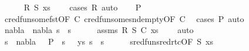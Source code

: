 \begin{isabellebody}
\ \ \ \ \isamarkupfalse%
\ R\ S\ {\isacartoucheopen}xs\ {\isacharequal}{\kern0pt}\ {\isacharbrackleft}{\kern0pt}{\isacharbrackright}{\kern0pt}{\isacartoucheclose}\ \isamarkupfalse%
\ {\isacharparenleft}{\kern0pt}cases\ R{\isacharparenright}{\kern0pt}\ auto\isanewline
\ \ \isamarkupfalse%
\ {\isachardoublequoteopen}P{}\ {\isacharequal}{\kern0pt}\ {\isacharparenleft}{\kern0pt}{\isacharbrackleft}{\kern0pt}{\isacharbrackright}{\kern0pt}{\isacharcomma}{\kern0pt}{\isacharbrackleft}{\kern0pt}{\isacharbrackright}{\kern0pt}{\isacharparenright}{\kern0pt}{\isachardoublequoteclose}\isanewline
\ \ \ \ \isamarkupfalse%
\ cred{\isacharunderscore}{\kern0pt}fun{\isacharunderscore}{\kern0pt}some{\isacharunderscore}{\kern0pt}fst{\isacharbrackleft}{\kern0pt}OF\ C{\isacharbrackright}{\kern0pt}\ cred{\isacharunderscore}{\kern0pt}fun{\isacharunderscore}{\kern0pt}some{\isacharunderscore}{\kern0pt}snd{\isacharunderscore}{\kern0pt}empty{\isacharbrackleft}{\kern0pt}OF\ C{\isacharbrackright}{\kern0pt}\ \isamarkupfalse%
\ {\isacharparenleft}{\kern0pt}cases\ P{}{\isacharparenright}{\kern0pt}\ auto\isanewline
\ \ \isamarkupfalse%
\ {\isachardoublequoteopen}nabla{}\ {\isacharequal}{\kern0pt}\ nabla{\isachardoublequoteclose}\ {\isachardoublequoteopen}s{}\ {\isacharequal}{\kern0pt}\ s{\isachardoublequoteclose}\isanewline
\ \ \ \ \isamarkupfalse%
\ assms\ R\ S\ C\ {\isacartoucheopen}xs\ {\isacharequal}{\kern0pt}\ {\isacharbrackleft}{\kern0pt}{\isacharbrackright}{\kern0pt}{\isacartoucheclose}\ \isamarkupfalse%
\ auto\isanewline
\ \ \isamarkupfalse%
\ s{}\ \ {\isachardoublequoteopen}nabla{}\ {\isacharequal}{\kern0pt}\ {\isacharbraceleft}{\kern0pt}{\isacharbraceright}{\kern0pt}{\isachardoublequoteclose}\ {\isachardoublequoteopen}P\ {\isasymturnstile}\ s{}\ {\isasymleadsto}\isactrlsup {\isacharasterisk}{\kern0pt}\ {\isacharparenleft}{\kern0pt}{\isacharbrackleft}{\kern0pt}{\isacharbrackright}{\kern0pt}{\isacharcomma}{\kern0pt}\ ys{\isacharparenright}{\kern0pt}{\isachardoublequoteclose}\ {\isachardoublequoteopen}s{}\ {\isacharequal}{\kern0pt}\ s{}{\isachardoublequoteclose}\isanewline
\ \ \ \ \isamarkupfalse%
\ sred{\isacharunderscore}{\kern0pt}fun{\isacharunderscore}{\kern0pt}sred{\isacharunderscore}{\kern0pt}rtc{\isacharbrackleft}{\kern0pt}OF\ S{\isacharbrackright}{\kern0pt}\ {\isacartoucheopen}xs\ {\isacharequal}{\kern0pt}\ {\isacharbrackleft}{\kern0pt}{\isacharbrackright}{\kern0pt}{\isacartoucheclose}\ \isamarkupfalse%

\end{isabellebody}
